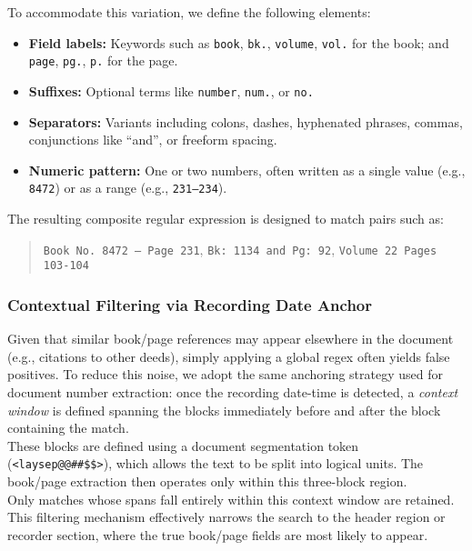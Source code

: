 \documentclass{article}
\begin{document}
To accommodate this variation, we define the following elements:

\begin{itemize}
    \item \textbf{Field labels:} Keywords such as \texttt{book}, \texttt{bk.}, \texttt{volume}, \texttt{vol.} for the book; and \texttt{page}, \texttt{pg.}, \texttt{p.} for the page.
    \item \textbf{Suffixes:} Optional terms like \texttt{number}, \texttt{num.}, or \texttt{no.}
    \item \textbf{Separators:} Variants including colons, dashes, hyphenated phrases, commas, conjunctions like ``and'', or freeform spacing.
    \item \textbf{Numeric pattern:} One or two numbers, often written as a single value (e.g., \texttt{8472}) or as a range (e.g., \texttt{231--234}).
\end{itemize}

The resulting composite regular expression is designed to match pairs such as:

\begin{quote}
\texttt{Book No. 8472 -- Page 231}, \quad \texttt{Bk: 1134 and Pg: 92}, \quad \texttt{Volume 22 Pages 103-104}
\end{quote}

\subsubsection{Contextual Filtering via Recording Date Anchor}

Given that similar book/page references may appear elsewhere in the document (e.g., citations to other deeds), simply applying a global regex often yields false positives. To reduce this noise, we adopt the same anchoring strategy used for document number extraction: once the recording date-time is detected, a \textit{context window} is defined spanning the blocks immediately before and after the block containing the match. \\

These blocks are defined using a document segmentation token (\texttt{<laysep@@\#\#\$\$>}), which allows the text to be split into logical units. The book/page extraction then operates only within this three-block region. \\

Only matches whose spans fall entirely within this context window are retained. This filtering mechanism effectively narrows the search to the header region or recorder section, where the true book/page fields are most likely to appear.
\end{document}
